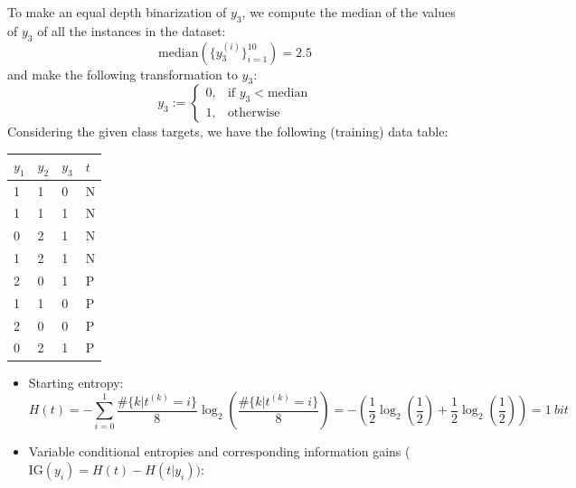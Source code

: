 \documentclass{exam}
\begin{document}
\begin{questions}
        \item To make an equal depth binarization of $y_3$, we compute the median of the values of $y_3$ of all the instances in the dataset:
        \begin{equation*}
             \text{median}(\{y^{(i)}_{3}\}_{i = 1}^{10}) = 2.5
        \end{equation*}
        and make the following transformation to $y_3$:
        \begin{equation*}
            y_3 :=
            \begin{cases}
                0, & \text{if } y_3 < \text{median} \\
                1, & \text{otherwise}
            \end{cases}
        \end{equation*}
        Considering the given class targets, we have the following (training) data table:
        \begin{table}[H]
            \centering
            \begin{tabular}{llll}
            $y_1$ & $y_2$ & $y_3$ & $t$ \\ \hline
            1     & 1     & 0     & N   \\
            1     & 1     & 1     & N   \\
            0     & 2     & 1     & N   \\
            1     & 2     & 1     & N   \\
            2     & 0     & 1     & P   \\
            1     & 1     & 0     & P   \\
            2     & 0     & 0     & P   \\
            0     & 2     & 1     & P  
            \end{tabular}
        \end{table}
        \begin{itemize}
            \item Starting entropy:
            \begin{equation*}
                H(t) = - \sum_{i = 0}^{1}\frac{\#\{k|t^{(k)} = i\}}{8} \log_2\left(\frac{\#\{k|t^{(k)} = i\}}{8}\right) = - \left(\frac{1}{2}\log_2\left(\frac{1}{2}\right) + \frac{1}{2}\log_2\left(\frac{1}{2}\right)\right) = 1 \medspace bit
            \end{equation*}
            \item Variable conditional entropies and corresponding information gains ($\text{IG}(y_i) = H(t) - H(t|y_i))$:

\end{itemize}
\end{questions}
\end{document}
